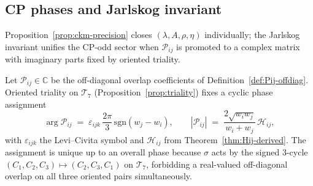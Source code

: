 \subsection{CP phases and Jarlskog invariant}
\label{sec:wave1-thread4:cp}

Proposition~\ref{prop:ckm-precision} closes $(\lambda,A,\rho,\eta)$ individually;
the Jarlskog invariant unifies the CP-odd sector when $\mathcal{P}_{ij}$ is
promoted to a complex matrix with imaginary parts fixed by oriented triality.

\begin{definition}
\label{def:thread4-Pij-complex}
Let $\mathcal{P}_{ij}\in\mathbb{C}$ be the off-diagonal overlap coefficients of
Definition~\ref{def:Pij-offdiag}. Oriented triality on $\mathcal{T}_7$
(Proposition~\ref{prop:triality}) fixes a cyclic phase assignment
\begin{equation}\label{eq:thread4-triality-phase}
  \arg\mathcal{P}_{ij}
  \;=\;
  \varepsilon_{ijk}\,
  \frac{2\pi}{3}\,
  \mathrm{sgn}(w_j-w_i),
  \qquad
  |\mathcal{P}_{ij}|
  \;=\;
  \frac{2\sqrt{w_iw_j}}{w_i+w_j}\,\mathcal{H}_{ij},
\end{equation}
with $\varepsilon_{ijk}$ the Levi--Civita symbol and $\mathcal{H}_{ij}$ from
Theorem~\ref{thm:Hij-derived}. The assignment is unique up to an overall phase
because $\sigma$ acts by the signed $3$-cycle
$(C_1,C_2,C_3)\mapsto(C_2,C_3,C_1)$ on $\mathcal{T}_7$, forbidding a
real-valued off-diagonal overlap on all three oriented pairs simultaneously.
\end{definition}


